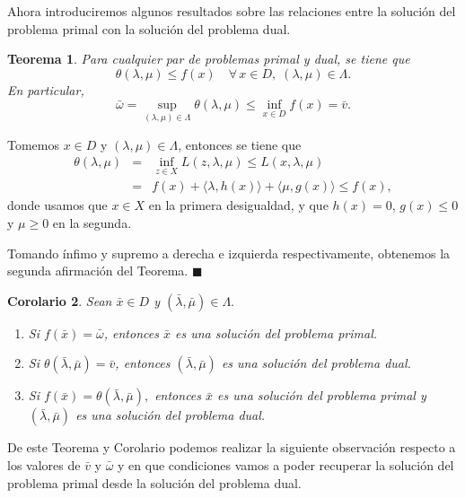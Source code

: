 \documentclass[a4paper,12pt]{report}
\newcommand{\la}{\langle}
\newcommand{\ra}{\rangle}
\newcommand{\bx}{\bar{x}}
\newcommand{\om}{\omega}
\newcommand{\lam}{\lambda}
\newcommand{\blam}{\bar{\lam}}
\newcommand{\bmu}{\bar{\mu}}
\newtheorem{teo}{Teorema}[section]
\newtheorem{cor}[teo]{Corolario}
\newenvironment{dem}{\vspace*{-0.1cm}{\it Demostraci\'on:}}{\hfill
$\blacksquare$\\}
\newcounter{obs}
\begin{document}
Ahora introduciremos algunos resultados sobre las relaciones entre la soluci\'on del problema primal con la soluci\'on del problema dual.

\begin{teo}
Para cualquier par de problemas primal y dual, se tiene que
$$\theta(\lam,\mu)\leq f(x)\quad\forall\,x\in D,\;(\lam,\mu)\in\Lambda.$$
En particular,
$$\bar{\om}=\sup_{(\lam,\mu)\in\Lambda}\theta(\lam,\mu)\leq\inf_{x\in D}f(x)=\bar{v}.$$
\end{teo}
\begin{dem}
Tomemos $x\in D$ y $(\lam,\mu)\in \Lambda$, entonces se tiene que 
\begin{eqnarray*}
\theta(\lam,\mu)&=&\inf_{z\in X}L(z,\lam,\mu)\leq L(x,\lam,\mu)\\
&=&f(x)+\la\lam,h(x)\ra+\la\mu,g(x)\ra\leq f(x),
\end{eqnarray*}
donde usamos que $x\in X$ en la primera desigualdad, y que $h(x)=0$, $g(x)\leq 0$ y $\mu\geq 0$ en la segunda.

Tomando \'infimo y supremo a derecha e izquierda respectivamente, ob\-te\-ne\-mos la segunda afirmaci\'on del Teorema.
\end{dem}


\begin{cor}
Sean $\bx\in D$ y $(\blam,\bmu)\in\Lambda.$
\begin{enumerate}
\item Si $f(\bx)=\bar{\om}$, entonces $\bx$ es una soluci\'on del problema primal.
\item Si $\theta(\blam,\bmu)=\bar{v}$, entonces $(\blam,\bmu)$ es una soluci\'on del problema dual.
\item Si $f(\bx)=\theta(\blam,\bmu),$ entonces $\bx$ es una soluci\'on del problema primal y $(\blam,\bmu)$ es una soluci\'on del problema dual.

\end{enumerate}
\end{cor}

De este Teorema y Corolario podemos realizar la siguiente observaci\'on respecto a los valores de $\bar{v}$ y $\bar{\om}$ y en que condiciones vamos a poder recuperar la soluci\'on del problema primal desde la soluci\'on del problema dual.\\
\end{document}
